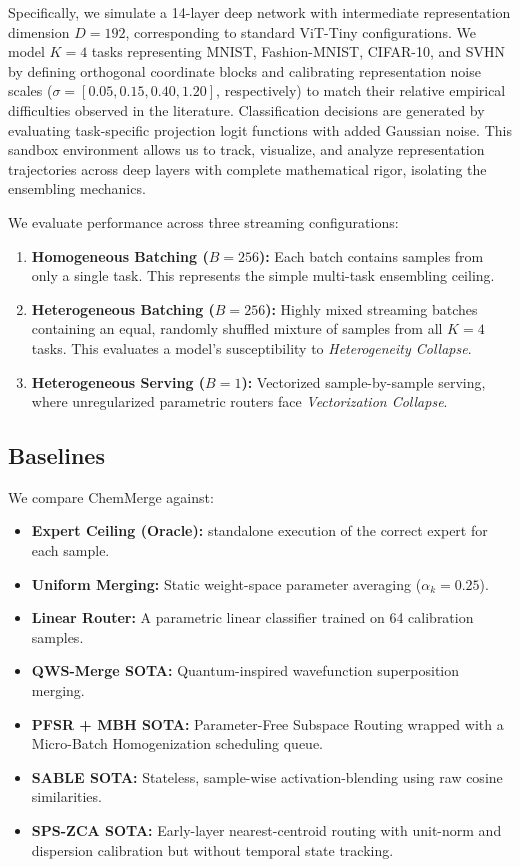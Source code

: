 Specifically, we simulate a 14-layer deep network with intermediate representation dimension $D=192$, corresponding to standard ViT-Tiny \cite{dosovitskiy20vit} configurations. We model $K=4$ tasks representing MNIST, Fashion-MNIST, CIFAR-10, and SVHN by defining orthogonal coordinate blocks and calibrating representation noise scales ($\sigma = [0.05, 0.15, 0.40, 1.20]$, respectively) to match their relative empirical difficulties observed in the literature. Classification decisions are generated by evaluating task-specific projection logit functions with added Gaussian noise. This sandbox environment allows us to track, visualize, and analyze representation trajectories across deep layers with complete mathematical rigor, isolating the ensembling mechanics.

We evaluate performance across three streaming configurations:
\begin{enumerate}
    \item \textbf{Homogeneous Batching ($B=256$):} Each batch contains samples from only a single task. This represents the simple multi-task ensembling ceiling.
    \item \textbf{Heterogeneous Batching ($B=256$):} Highly mixed streaming batches containing an equal, randomly shuffled mixture of samples from all $K=4$ tasks. This evaluates a model's susceptibility to \emph{Heterogeneity Collapse}.
    \item \textbf{Heterogeneous Serving ($B=1$):} Vectorized sample-by-sample serving, where unregularized parametric routers face \emph{Vectorization Collapse}.
\end{enumerate}

\subsection{Baselines}
We compare ChemMerge against:
\begin{itemize}
    \item \textbf{Expert Ceiling (Oracle):} standalone execution of the correct expert for each sample.
    \item \textbf{Uniform Merging:} Static weight-space parameter averaging ($\alpha_k = 0.25$).
    \item \textbf{Linear Router:} A parametric linear classifier trained on 64 calibration samples.
    \item \textbf{QWS-Merge SOTA:} Quantum-inspired wavefunction superposition merging.
    \item \textbf{PFSR + MBH SOTA:} Parameter-Free Subspace Routing wrapped with a Micro-Batch Homogenization scheduling queue.
    \item \textbf{SABLE SOTA:} Stateless, sample-wise activation-blending using raw cosine similarities.
    \item \textbf{SPS-ZCA SOTA:} Early-layer nearest-centroid routing with unit-norm and dispersion calibration but without temporal state tracking.
\end{itemize}

